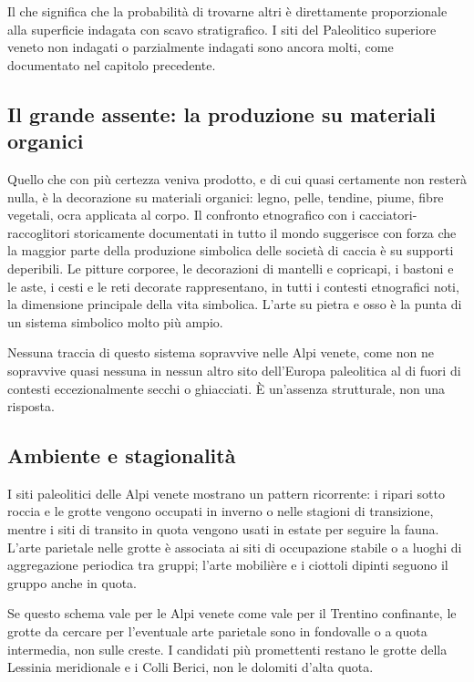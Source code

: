 Il che significa che la probabilità di trovarne altri è direttamente proporzionale alla superficie indagata con scavo stratigrafico. I siti del Paleolitico superiore veneto non indagati o parzialmente indagati sono ancora molti, come documentato nel capitolo precedente.

\subsection{Il grande assente: la produzione su materiali organici}

Quello che con più certezza veniva prodotto, e di cui quasi certamente non resterà nulla, è la decorazione su materiali organici: legno, pelle, tendine, piume, fibre vegetali, ocra applicata al corpo. Il confronto etnografico con i cacciatori-raccoglitori storicamente documentati in tutto il mondo suggerisce con forza che la maggior parte della produzione simbolica delle società di caccia è su supporti deperibili. Le pitture corporee, le decorazioni di mantelli e copricapi, i bastoni e le aste, i cesti e le reti decorate rappresentano, in tutti i contesti etnografici noti, la dimensione principale della vita simbolica. L'arte su pietra e osso è la punta di un sistema simbolico molto più ampio.

Nessuna traccia di questo sistema sopravvive nelle Alpi venete, come non ne sopravvive quasi nessuna in nessun altro sito dell'Europa paleolitica al di fuori di contesti eccezionalmente secchi o ghiacciati. È un'assenza strutturale, non una risposta.

\subsection{Ambiente e stagionalità}

I siti paleolitici delle Alpi venete mostrano un pattern ricorrente: i ripari sotto roccia e le grotte vengono occupati in inverno o nelle stagioni di transizione, mentre i siti di transito in quota vengono usati in estate per seguire la fauna. L'arte parietale nelle grotte è associata ai siti di occupazione stabile o a luoghi di aggregazione periodica tra gruppi; l'arte mobilière e i ciottoli dipinti seguono il gruppo anche in quota.

Se questo schema vale per le Alpi venete come vale per il Trentino confinante, le grotte da cercare per l'eventuale arte parietale sono in fondovalle o a quota intermedia, non sulle creste. I candidati più promettenti restano le grotte della Lessinia meridionale e i Colli Berici, non le dolomiti d'alta quota.


